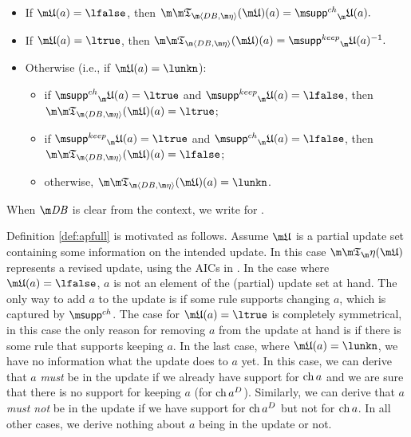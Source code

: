 \begin{definition}
\begin{itemize}
 \item If $\UUU(a)=\lfalse$, then $\Apfull(\UUU)(a) = \suppin_\UUU(a).$
 \item If $\UUU(a)=\ltrue$, then $\Apfull(\UUU)(a) = \suppout_\UUU(a)^{-1}.$
 \item Otherwise (i.e., if $\UUU(a) = \lunkn$):
  \begin{itemize}
    \item if $\suppin_\UUU(a) = \ltrue$ and $\suppout_\UUU(a)=\lfalse$, then $\Apfull(\UUU)(a)=\ltrue$;
    \item if $\suppout_\UUU(a) = \ltrue$ and $\suppin_\UUU(a)=\lfalse$, then $\Apfull(\UUU)(a)=\lfalse$;
    \item otherwise, $\Apfull(\UUU)(a)=\lunkn$.
\end{itemize}

\end{itemize}
When $\db$ is clear from the context, we write \Ap for \Apfull.
 
\end{definition}

Definition \ref{def:apfull} is motivated as follows. Assume $\UUU$ is a partial update set containing some information on the intended update. In this case $\Ap(\UUU)$ represents a revised update, using the AICs in \aics. 
In the case where $\UUU(a)=\lfalse$, $a$ is not an element of the (partial) update set at hand. The only way to add $a$ to the update is if some rule supports changing $a$, which is captured by $\suppin$. 
The case for $\UUU(a)=\ltrue$ is completely symmetrical, in this case the only reason for removing $a$ from the update at hand is if there is some rule that supports keeping $a$.
In the last case, where $\UUU(a)=\lunkn$, we have no information what the update does to $a$ yet. In this case, we can derive that $a$ \emph{must} be in the update if we already have support for $\operatorname{ch} a$ and we are sure that there is no support for keeping $a$ (for $\operatorname{ch} a^D$). Similarly, we can derive that $a$ \emph{must not} be in the update if we have support for $\operatorname{ch} a^D$ but not for $\operatorname{ch} a$. 
In all other cases, we derive nothing about $a$ being in the update or not. 


